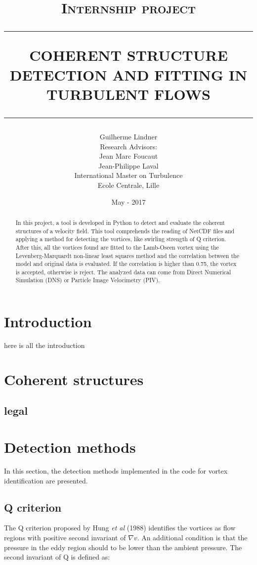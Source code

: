 \documentclass[12pt, a4paper, openany]{memoir}
\title{ \normalsize \textsc{Internship project}
	\\ [2.0cm]
	\hrule
	\vspace{0.5cm}
	\LARGE \textbf{\uppercase{Coherent structure detection and fitting in turbulent flows}} \\ [0.5cm]
	\hrule
	\vspace{0.5cm}
	\normalsize  \vspace*{5\baselineskip}}
\date{\vfill May - 2017}
\author{
	\Large Guilherme Lindner \\ [1.0cm]
	Research Advisors: \\
	Jean Marc Foucaut \\
	Jean-Philippe Laval  \\ [1.0cm]
	International Master on Turbulence\\ [0.2cm]
	Ecole Centrale, Lille \\}
\begin{document}
	
	\maketitle
	\thispagestyle{empty}
	\let\cleardoublepage\clearpage
	\frontmatter
	\begin{abstract}
		In this project, a tool is developed in Python to detect and evaluate the coherent structures of a velocity field.
		This tool comprehends the reading of NetCDF files and applying a method for detecting the vortices, like swirling strength of Q criterion. After this, all the vortices found are fitted to the Lamb-Oseen vortex using the Levenberg-Marquardt non-linear least squares method and the correlation between the model and original data is evaluated. If the correlation is higher than 0.75, the vortex is accepted, otherwise is reject. The analyzed data can come from Direct Numerical Simulation (DNS) or Particle Image Velocimetry (PIV).
	\end{abstract}
	\newpage
	\tableofcontents
	\newpage
	\listoftables
	\newpage
	\listoffigures

    \mainmatter

\chapter*{Introduction}
here is all the introduction

\chapter{Coherent structures}
\section{legal}

\chapter{Detection methods}
In this section, the detection methods implemented in the code for vortex identification are presented.

\section{Q criterion}

The Q criterion proposed by Hung \textit{et al} (1988) identifies the vortices as flow regions with positive second invariant of $\nabla v$. An additional condition is that the pressure in the eddy region should to be lower than the ambient pressure. The second invariant of Q is defined as:
\end{document}
